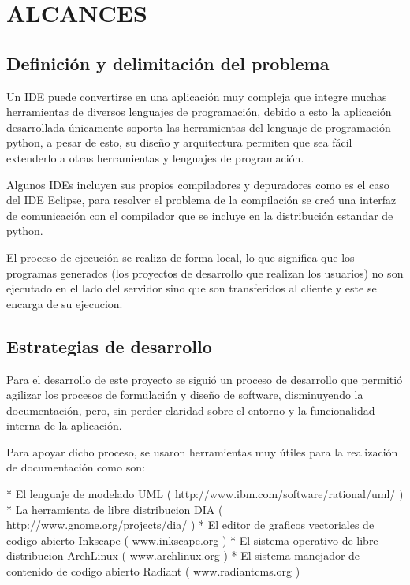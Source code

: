 \section{ALCANCES}

\subsection{Definición y delimitación del problema}

Un IDE puede convertirse en una aplicación muy compleja que integre muchas herramientas de diversos lenguajes de programación, debido a esto la aplicación desarrollada únicamente soporta las herramientas del lenguaje de programación python, a pesar de esto, su diseño y arquitectura permiten que sea fácil extenderlo a otras herramientas y lenguajes de programación.

Algunos IDEs incluyen sus propios compiladores y depuradores como es el caso del IDE Eclipse, para resolver el problema de la compilación se creó una interfaz de comunicación con el compilador que se incluye en la distribución estandar de python.

El proceso de ejecución se realiza de forma local, lo que significa que los programas generados (los proyectos de desarrollo que realizan los usuarios) no son ejecutado en el lado del servidor sino que son transferidos al cliente y este se encarga de su ejecucion.

\subsection{Estrategias de desarrollo}

Para el desarrollo de este proyecto se siguió un proceso de desarrollo que permitió agilizar los procesos de formulación y diseño de software, disminuyendo la documentación, pero, sin perder claridad sobre el entorno y la funcionalidad interna de la aplicación.

Para apoyar dicho proceso, se usaron herramientas muy útiles para la realización de documentación como son:

* El lenguaje de modelado UML ( http://www.ibm.com/software/rational/uml/ )
* La herramienta de libre distribucion DIA ( http://www.gnome.org/projects/dia/ )
* El editor de graficos vectoriales de codigo abierto Inkscape ( www.inkscape.org )
* El sistema operativo de libre distribucion ArchLinux ( www.archlinux.org )
* El sistema manejador de contenido de codigo abierto Radiant ( www.radiantcms.org )
